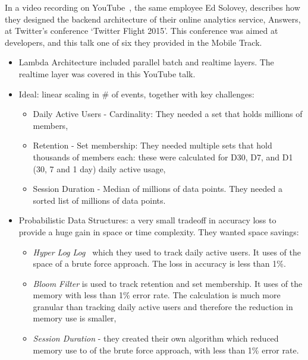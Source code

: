 In a video recording on YouTube~\citep{twitterdev2015_a_deep_dive_into_the_answers_backend}, the same employee Ed Solovey, describes how they designed the backend architecture of their online analytics service, Answers, at Twitter's conference `Twitter Flight 2015'. This conference was aimed at developers, and this talk one of six they provided in the Mobile Track.

\begin{itemize}
    \item Lambda Architecture included parallel batch and realtime layers. The realtime layer was covered in this YouTube talk.
    \item Ideal: linear scaling in \# of events, together with key challenges: 
    \begin{itemize}
        \item Daily Active Users - Cardinality: They needed a set that holds millions of members,
        \item Retention - Set membership: They needed multiple sets that hold thousands of members each: these were calculated for D30, D7, and D1 (30, 7 and 1 day) daily active usage,
        \item Session Duration - Median of millions of data points. They needed a sorted list of millions of data points.
    \end{itemize}
    \item Probabilistic Data Structures: a very small tradeoff in accuracy loss to provide a huge gain in space or time complexity. They wanted space savings:
    \begin{itemize}
        \item \emph{Hyper Log Log}~\citep{flajolet2007_hyper_log_log, heule2013_hyper_log_log_in_practice} which they used to track daily active users. It uses  of the space of a brute force approach. The loss in accuracy is less than 1\%.
        \item \emph{Bloom Filter} is used to track retention and set membership. It uses  of the memory with less than 1\% error rate. The calculation is much more granular than tracking daily active users and therefore the reduction in memory use is smaller,
        \item \emph{Session Duration} - they created their own algorithm which reduced memory use to  of the brute force approach, with less than 1\% error rate.
    \end{itemize}
    
\end{itemize}



